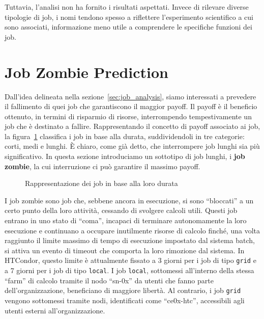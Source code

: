 Tuttavia, l'analisi non ha fornito i risultati aspettati. Invece di rilevare
diverse tipologie di job, i nomi tendono spesso a riflettere l'esperimento
scientifico a cui sono associati, informazione meno utile a comprendere le
specifiche funzioni dei job.

\section{Job Zombie Prediction}
\label{sec:job_zombie}

Dall'idea delineata nella sezione~\ref{sec:job_analysis}, siamo interessati a
prevedere il fallimento di quei job che garantiscono il maggior payoff. Il
payoff è il beneficio ottenuto, in termini di risparmio di risorse,
interrompendo tempestivamente un job che è destinato a fallire. Rappresentando
il concetto di payoff associato ai job, la figura~\ref{fig:job_payoff}
classifica i job in base alla durata, suddividendoli in tre categorie: corti,
medi e lunghi. È chiaro, come già detto, che interrompere job lunghi sia più
significativo. In questa sezione introduciamo un sottotipo di job lunghi, i
\textbf{job zombie}, la cui interruzione ci può garantire il massimo payoff.

\begin{figure}[!ht]
    \centering
    \caption{Rappresentazione dei job in base alla loro durata}
    \label{fig:job_payoff}
\end{figure}

I job zombie sono job che, sebbene ancora in esecuzione, si sono ``bloccati''
a un certo punto della loro attività, cessando di svolgere calcoli utili.
Questi job entrano in uno stato di ``coma'', incapaci di terminare
autonomamente la loro esecuzione e continuano a occupare inutilmente risorse
di calcolo finché, una volta raggiunto il limite massimo di tempo di
esecuzione impostato dal sistema batch, si attiva un evento di timeout che
comporta la loro rimozione dal sistema. In HTCondor, questo limite è
attualmente fissato a 3 giorni per i job di tipo \texttt{grid} e a 7 giorni
per i job di tipo \texttt{local}.
I job \texttt{local}, sottomessi all'interno della stessa ``farm'' di calcolo
tramite il nodo ``sn-0x'' da utenti che fanno parte dell'organizzazione,
beneficiano di maggiore libertà. Al contrario, i job \texttt{grid} vengono
sottomessi tramite nodi, identificati come ``ce0x-htc'', accessibili agli
utenti esterni all'organizzazione.

